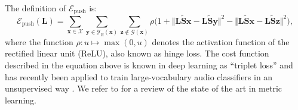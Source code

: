 \documentclass{bmcart}
\begin{document}
The definition of $\mathcal{E}_{\textrm{push}}$ is:
\begin{equation}
\mathcal{E}_{\textrm{push}} (\mathbf{L}) =
\sum_{\boldsymbol{x}\in\mathcal{X}}
\sum_{\boldsymbol{y}\in\mathcal{Y}_R (\boldsymbol{x})}
\sum_{\boldsymbol{z}\not\in\mathcal{G}(\boldsymbol{x})}
\rho
\Big(
1 +
\big\Vert
\mathbf{L}\mathbf{\widetilde{S}}\boldsymbol{x} - \mathbf{L}\mathbf{\widetilde{S}}\boldsymbol{y}
\big\Vert^2
-
\big\Vert
\mathbf{L}\mathbf{\widetilde{S}}\boldsymbol{x} - \mathbf{L}\mathbf{\widetilde{S}}\boldsymbol{z}
\big\Vert^2
\Big),
\end{equation}
where the function $\rho : u \mapsto \max (0, u)$ denotes the activation function of the rectified linear unit (ReLU), also known as hinge loss.
The cost function described in the equation above is known in deep learning as ``triplet loss'' and has recently been applied to train large-vocabulary audio classifiers in an unsupervised way \cite{jansen2018icassp}.
We refer to \cite{bellet2015book} for a review of the state of the art in metric learning.







\end{document}
